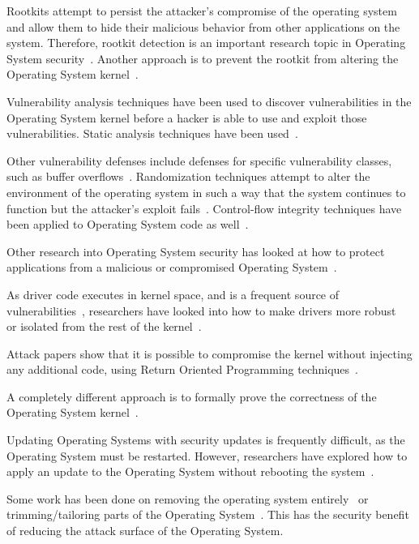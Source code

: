 \documentclass[11pt,letterpaper]{article}
\begin{document}
Rootkits attempt to persist the attacker's compromise of the operating
system and allow them to hide their malicious behavior from other
applications on the system. Therefore, rootkit detection is an
important research topic in Operating System
security~\cite{Petroni2004, Wang2005, Petroni2007, Payne2008,
  Sharif2009, Yin2010, Bianchi2012}. Another approach is to prevent
the rootkit from altering the Operating System
kernel~\cite{Riley2008a, Wang2009, Grace2010, Gadaleta2011}.

Vulnerability analysis techniques have been used to discover
vulnerabilities in the Operating System kernel before a hacker is able
to use and exploit those vulnerabilities. Static analysis techniques
have been used~\cite{Chou2001, Chen2011}.

Other vulnerability defenses include defenses for specific
vulnerability classes, such as buffer overflows~\cite{Dalton2008}.
Randomization techniques attempt to alter the environment of the
operating system in such a way that the system continues to function
but the attacker's exploit fails~\cite{Lin2009, Giuffrida2012}.
Control-flow integrity techniques have been applied to Operating
System code as well~\cite{Li2011a}.

Other research into Operating System security has looked at how to
protect applications from a malicious or compromised Operating
System~\cite{Ta-min2006, Onarlioglu2013, Li2014}.

As driver code executes in kernel space, and is a frequent source of
vulnerabilities~\cite{Kadav2012}, researchers have looked into how to
make drivers more robust~\cite{Ganapathy2008, Hruby2012} or isolated
from the rest of the kernel~\cite{Boyd-Wickizer2010}.

Attack papers show that it is possible to compromise the kernel
without injecting any additional code, using Return Oriented
Programming techniques~\cite{Hund2009}.

A completely different approach is to formally prove the correctness
of the Operating System kernel~\cite{Klein2009}.

Updating Operating Systems with security updates is frequently
difficult, as the Operating System must be restarted. However,
researchers have explored how to apply an update to the Operating
System without rebooting the system~\cite{Arnold2009}.

Some work has been done on removing the operating system
entirely~\cite{Madhavapeddy2010} or trimming/tailoring parts of the
Operating System~\cite{Kurmus2011, Madhavapeddy2013, Howell2013,
  Kurmus2013, Kurmus2014}. This has the security benefit of reducing
the attack surface of the Operating System.
\end{document}
